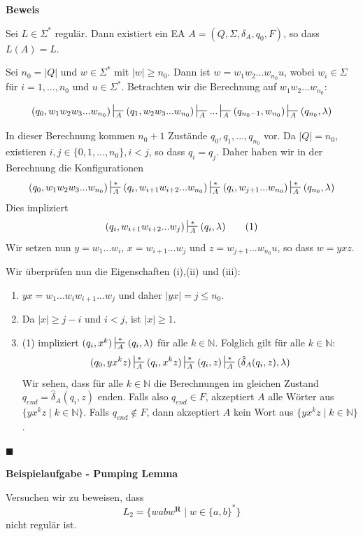 \documentclass[a4paper, 11pt]{article}
\def\N{\mathbb{N}}
\newcommand\myTitle[1]{{\large \textbf {#1}}}
\begin{document}
    \textbf{Beweis}

    Sei $L \in \Sigma^*$ regulär. Dann existiert ein EA $A= (Q, \Sigma, \delta_A, q_0, F)$, so dass $L(A) = L$.
    
    Sei $n_0 = |Q|$ und $w \in \Sigma^*$ mit $|w| \geq n_0$. Dann ist $w = w_1w_2...w_{n_0}u$, wobei $w_i \in \Sigma$ für $i = 1, ..., n_0$ und $u \in \Sigma^*$. Betrachten wir die Berechnung auf $w_1w_2...w_{n_0}$:

    $$(q_0, w_1w_2w_3...w_{n_0}) \sststile{A}{} (q_1, w_2w_3...w_{n_0}) \sststile{A}{} ... \sststile{A}{} (q_{n_0-1}, w_{n_0}) \sststile{A}{} (q_{n_0}, \lambda)$$

    In dieser Berechnung kommen $n_0 + 1$ Zustände $q_0,q_1, ..., q_{n_0}$ vor. Da $|Q| = n_0$, existieren $i, j \in \{0, 1, ..., n_0\}, i < j$, so dass $q_i = q_j$. Daher haben wir in der Berechnung die Konfigurationen
    $$(q_0, w_1w_2w_3...w_{n_0}) \sststile{A}{*} (q_i, w_{i+1}w_{i+2}...w_{n_0}) \sststile{A}{*} (q_i, w_{j+1}...w_{n_0}) \sststile{A}{*} (q_{n_0}, \lambda)$$
    Dies impliziert
    $$(q_i, w_{i+1}w_{i+2}...w_j) \sststile{A}{*} (q_i, \lambda) \qquad (1)$$
    Wir setzen nun $y = w_1...w_i$, $x = w_{i+1}...w_j$ und $z = w_{j+1}...w_{n_0}u$, so dass $w = yxz$.

    Wir überprüfen nun die Eigenschaften (i),(ii) und (iii):
    \begin{enumerate}[label = (\roman*)]
        \item $yx = w_1...w_iw_{i+1}...w_j$ und daher $|yx| = j \leq n_0$.
        \item Da $|x| \geq j-i$ und $i < j$, ist $|x| \geq 1$.
        \item (1) impliziert $(q_i, x^k) \sststile{A}{*} (q_i, \lambda)$ für alle $k \in \N$.
        Folglich gilt für alle $k \in \N$:
        $$(q_0, yx^kz) \sststile{A}{*} (q_i, x^kz) \sststile{A}{*} (q_i, z) \sststile{A}{*} (\hat{\delta}_A(q_i, z), \lambda)$$
        Wir sehen, dass für alle $k \in \N$ die Berechnungen im gleichen Zustand $q_{end} = \hat{\delta}_A(q_i, z)$ enden. Falls also $q_{end} \in F$, akzeptiert $A$ alle Wörter aus $\{yx^kz \mid k \in \N\}$. Falls $q_{end}\notin F$, dann akzeptiert $A$ kein Wort aus $\{yx^kz \mid k \in \N\}$.
    \end{enumerate}
    \hspace*{0pt}\hfill$\blacksquare$



    \myTitle{Beispielaufgabe - Pumping Lemma}

    Versuchen wir zu beweisen, dass 
    $$L_2 = \{wabw^{\textbf{R}} \mid w \in \{a,b\}^*\}$$
    nicht regulär ist.
\end{document}
